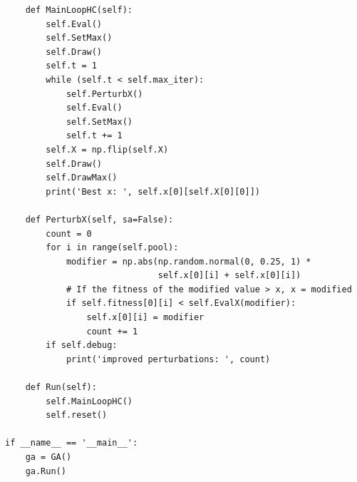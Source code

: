 \documentclass[12pt]{article}
\begin{document}
\begin{lstlisting}
    def MainLoopHC(self):
        self.Eval()
        self.SetMax()
        self.Draw()
        self.t = 1
        while (self.t < self.max_iter):
            self.PerturbX()
            self.Eval()
            self.SetMax()
            self.t += 1
        self.X = np.flip(self.X)
        self.Draw()
        self.DrawMax()
        print('Best x: ', self.x[0][self.X[0][0]])

    def PerturbX(self, sa=False):
        count = 0
        for i in range(self.pool):
            modifier = np.abs(np.random.normal(0, 0.25, 1) * 
                              self.x[0][i] + self.x[0][i])
            # If the fitness of the modified value > x, x = modified
            if self.fitness[0][i] < self.EvalX(modifier):
                self.x[0][i] = modifier
                count += 1
        if self.debug:
            print('improved perturbations: ', count)

    def Run(self):
        self.MainLoopHC()
        self.reset()

if __name__ == '__main__':
    ga = GA()
    ga.Run()
\end{lstlisting}

\newpage
\end{document}
